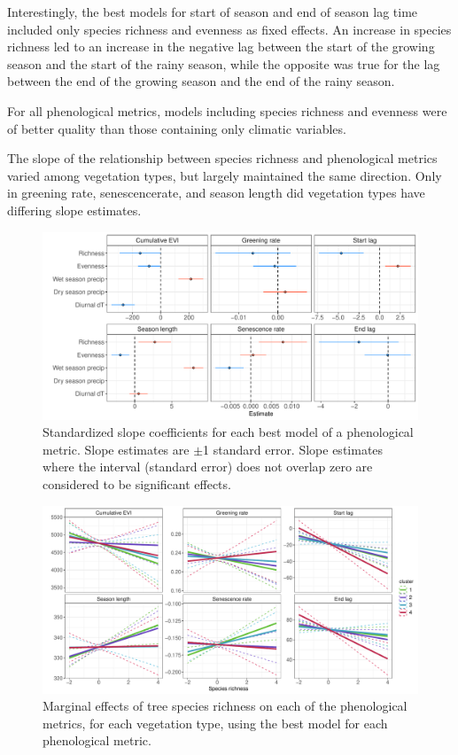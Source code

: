 \documentclass[11pt,a4paper]{article}
\begin{document}
Interestingly, the best models for start of season and end of season lag time included only species richness and evenness as fixed effects. An increase in species richness led to an increase in the negative lag between the start of the growing season and the start of the rainy season, while the opposite was true for the lag between the end of the growing season and the end of the rainy season. 

For all phenological metrics, models including species richness and evenness were of better quality than those containing only climatic variables.  

The slope of the relationship between species richness and phenological metrics varied among vegetation types, but largely maintained the same direction. Only in greening rate, senescencerate, and season length did vegetation types have differing slope estimates.



 

\begin{figure}[H]
\centering
	\includegraphics[width=\textwidth]{mod_slopes.pdf}
	\caption{Standardized slope coefficients for each best model of a phenological metric. Slope estimates are $\pm$1 standard error. Slope estimates where the interval (standard error) does not overlap zero are considered to be significant effects.}
	\label{mod_slopes}
\end{figure}

\begin{figure}[H]
\centering
	\includegraphics[width=\textwidth]{mod_marg.pdf}
	\caption{Marginal effects of tree species richness on each of the phenological metrics, for each vegetation type, using the best model for each phenological metric.}
	\label{mod_marg}
\end{figure}
\end{document}
